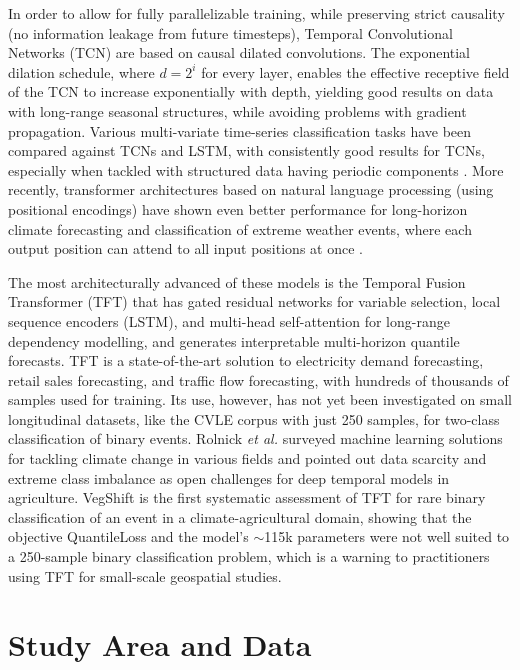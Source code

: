\documentclass{ieeeaccess}
\begin{document}
In order to allow for fully parallelizable training, while preserving strict causality (no information leakage from future timesteps), Temporal Convolutional Networks (TCN) \cite{bai2018} are based on causal dilated convolutions. The exponential dilation schedule, where $d = 2^i$ for every layer, enables the effective receptive field of the TCN to increase exponentially with depth, yielding good results on data with long-range seasonal structures, while avoiding problems with gradient propagation. Various multi-variate time-series classification tasks have been compared against TCNs and LSTM, with consistently good results for TCNs, especially when tackled with structured data having periodic components \cite{bai2018}. More recently, transformer architectures based on natural language processing (using positional encodings) have shown even better performance for long-horizon climate forecasting and classification of extreme weather events, where each output position can attend to all input positions at once \cite{vaswani2017}.

The most architecturally advanced of these models is the Temporal Fusion Transformer (TFT) \cite{lim2021} that has gated residual networks for variable selection, local sequence encoders (LSTM), and multi-head self-attention for long-range dependency modelling, and generates interpretable multi-horizon quantile forecasts. TFT is a state-of-the-art solution to electricity demand forecasting, retail sales forecasting, and traffic flow forecasting, with hundreds of thousands of samples used for training. Its use, however, has not yet been investigated on small longitudinal datasets, like the CVLE corpus with just 250 samples, for two-class classification of binary events. Rolnick \textit{et al.} \cite{rolnick2022} surveyed machine learning solutions for tackling climate change in various fields and pointed out data scarcity and extreme class imbalance as open challenges for deep temporal models in agriculture. VegShift is the first systematic assessment of TFT for rare binary classification of an event in a climate-agricultural domain, showing that the objective QuantileLoss and the model's $\sim$115k parameters were not well suited to a 250-sample binary classification problem, which is a warning to practitioners using TFT for small-scale geospatial studies.

\section{Study Area and Data}
\label{sec:data}
\end{document}
